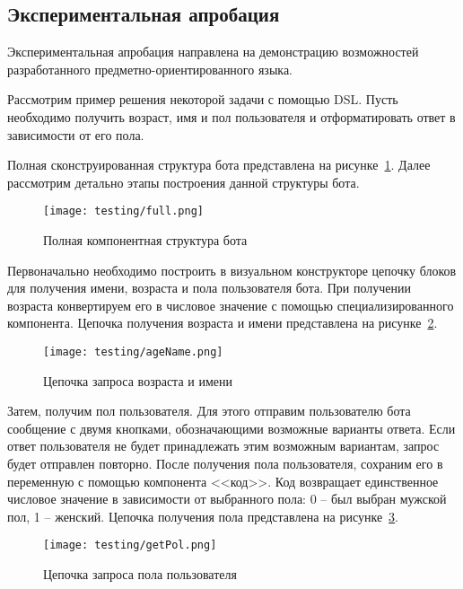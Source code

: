 \subsection{Экспериментальная апробация}

Экспериментальная апробация направлена на демонстрацию возможностей разработанного предметно-ориентированного языка.

Рассмотрим пример решения некоторой задачи с помощью DSL.
Пусть необходимо получить возраст, имя и пол пользователя и отформатировать ответ в зависимости от его пола.


Полная сконструированная структура бота представлена на рисунке~\ref{f:experimentFull}.
Далее рассмотрим детально этапы построения данной структуры бота.

\clearpage

\begin{figure}[!ht]
	\centering
	\texttt{[image: testing/full.png]}
	\caption{Полная компонентная структура бота}
	\label{f:experimentFull}
\end{figure}

Первоначально необходимо построить в визуальном конструкторе цепочку блоков для получения имени, возраста и пола пользователя бота.
При получении возраста конвертируем его в числовое значение с помощью специализированного компонента.
Цепочка получения возраста и имени представлена на рисунке~\ref{f:experimentAgeName}.

\begin{figure}[!ht]
	\centering
	\vspace{\toppaddingoffigure}
	\texttt{[image: testing/ageName.png]}
	\caption{Цепочка запроса возраста и имени}
	\label{f:experimentAgeName}
\end{figure}

Затем, получим пол пользователя. Для этого отправим пользователю бота сообщение с двумя кнопками,
обозначающими возможные варианты ответа. Если ответ пользователя не будет принадлежать этим возможным вариантам, запрос будет отправлен повторно.
После получения пола пользователя, сохраним его в переменную с помощью компонента <<код>>.
Код возвращает единственное числовое значение в зависимости от выбранного пола: 0 -- был выбран мужской пол, 1 -- женский.
Цепочка получения пола представлена на рисунке~\ref{f:experimentPol}.

\begin{figure}[!ht]
	\centering
	\vspace{\toppaddingoffigure}
	\texttt{[image: testing/getPol.png]}
	\caption{Цепочка запроса пола пользователя}
	\label{f:experimentPol}
\end{figure}


